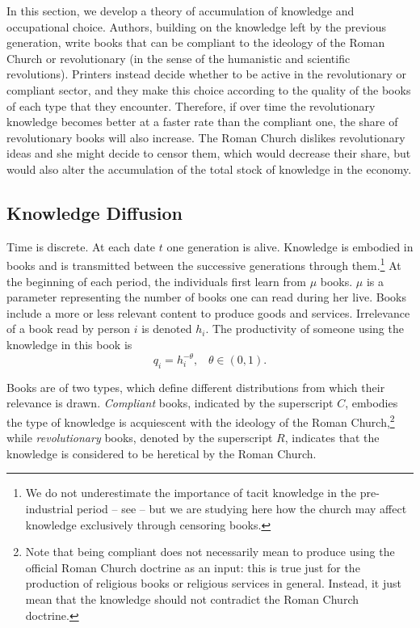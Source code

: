 \documentclass[12pt]{article}
\begin{document}
In this section, we develop a theory of accumulation of knowledge and occupational choice. Authors, building on the knowledge left by the previous generation, write books that can be compliant to the ideology of the Roman Church or revolutionary (in the sense of the humanistic and scientific revolutions). Printers instead decide whether to be active in the revolutionary or compliant sector, and they make this choice according to the quality of the books of each type that they encounter. Therefore, if over time the revolutionary knowledge becomes better at a faster rate than the compliant one, the share of revolutionary books will also increase. The Roman Church dislikes revolutionary ideas and she might decide to censor them, which would decrease their share, but would also alter the accumulation of the total stock of knowledge in the economy.

\subsection{Knowledge Diffusion}

Time is discrete. At each date $t$ one generation is alive. Knowledge is embodied in books and is transmitted between the successive generations through them.\footnote{We do not underestimate the importance of tacit knowledge in the pre-industrial period -- see  -- but we are studying here how the church may affect knowledge exclusively through censoring books.} At the beginning of each period, the individuals first learn from $\mu$ books. $\mu$ is a parameter representing the number of books one can read during her live. Books include a more or less relevant content to produce goods and services. Irrelevance of a book read by person $i$ is denoted $h_{i}$. The productivity of someone using the knowledge in this book is
\begin{equation}\label{eq:qi}
q_i=h_i^{-\theta}, \;\;\; \theta\in(0,1).
\end{equation}

Books are of two types, which define different distributions from which their relevance is drawn.
 \textit{Compliant} books, indicated by the superscript $C$, embodies the type of knowledge is acquiescent with the ideology of the Roman Church,\footnote{Note that being compliant does not necessarily mean to produce using the official Roman Church doctrine as an input: this is true just for the production of religious books or religious services in general. Instead, it just mean that the knowledge should not contradict the Roman Church doctrine.} while \textit{revolutionary} books, denoted by the superscript $R$, indicates that the knowledge  is considered to be heretical by the Roman Church.
\end{document}
